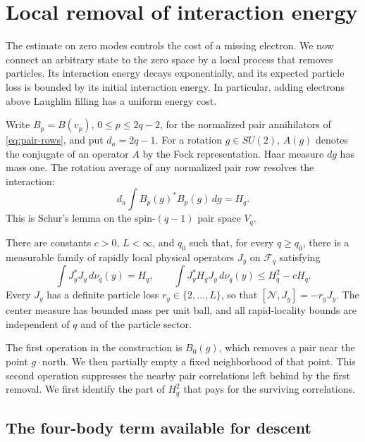 \section{Local removal of interaction energy}
\label{sec:energy}

The estimate on zero modes controls the cost of a missing electron.  We now
connect an arbitrary state to the zero space by a local process that removes
particles.  Its interaction energy decays exponentially, and its expected
particle loss is bounded by its initial interaction energy.  In particular,
adding electrons above Laughlin filling has a uniform energy cost.

Write $B_p=B(v_p)$, $0\le p\le 2q-2$, for the normalized pair annihilators
of \eqref{eq:pair-rows}, and put $d_a=2q-1$.  For a rotation $g\in SU(2)$,
$A(g)$ denotes the conjugate of an operator $A$ by the Fock representation.
Haar measure $dg$ has mass one.  The rotation average of any normalized
pair row resolves the interaction:
\begin{equation}\label{eq:pair-resolution}
 d_a\int B_p(g)^*B_p(g)\,dg=H_q.
\end{equation}
This is Schur's lemma on the spin-$(q-1)$ pair space $V_q$.

\begin{theorem}\label{thm:local-energy-descent}
There are constants $c>0$, $L<\infty$, and $q_0$ such that, for every
$q\ge q_0$, there is a measurable family of rapidly local physical
operators $J_y$ on $\mathcal F_q$ satisfying
\begin{equation}\label{eq:energy-descent}
 \int J_y^*J_y\,d\nu_q(y)=H_q,
 \qquad
 \int J_y^*H_qJ_y\,d\nu_q(y)\le H_q^2-cH_q.
\end{equation}
Every $J_y$ has a definite particle loss $r_y\in\{2,\ldots,L\}$, so that
$[\mathcal N,J_y]=-r_yJ_y$.  The center measure has bounded mass per unit
ball, and all rapid-locality bounds are independent of $q$ and of the
particle sector.
\end{theorem}

The first operation in the construction is $B_0(g)$, which removes a pair
near the point $g\cdot\mathrm{north}$.  We then partially empty a fixed
neighborhood of that point.  This second operation suppresses the nearby
pair correlations left behind by the first removal.  We first identify the
part of $H_q^2$ that pays for the surviving correlations.

\subsection{The four-body term available for descent}

